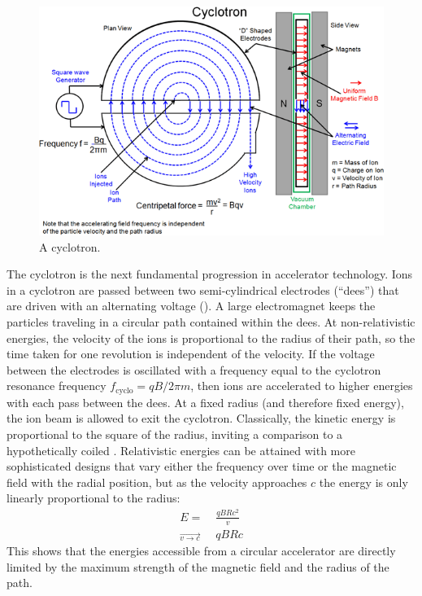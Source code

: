 \begin{figure}[t]
  \includegraphics{cyclotron.png}
  \caption{A cyclotron.}
  \label{fig:cyclotron}
\end{figure}
The cyclotron is the next fundamental progression in accelerator technology.
Ions in a cyclotron are passed between two semi-cylindrical electrodes (``dees'') that are driven with an alternating voltage ().
A large electromagnet keeps the particles traveling in a circular path contained within the dees.
At non-relativistic energies, the velocity of the ions is proportional to the radius of their path, so the time taken for one revolution is independent of the velocity.
If the voltage between the electrodes is oscillated with a frequency equal to the cyclotron resonance frequency $f_\textrm{cyclo} = q B / 2\pi m$, then ions are accelerated to higher energies with each pass between the dees.
At a fixed radius (and therefore fixed energy), the ion beam is allowed to exit the cyclotron.
Classically, the kinetic energy is proportional to the square of the radius, inviting a comparison to a hypothetically coiled \linac.
Relativistic energies can be attained with more sophisticated designs that vary either the frequency over time or the magnetic field with the radial position, but as the velocity approaches $c$ the energy is only linearly proportional to the radius:
\begin{align}
\label{eq:gyroradius}
E =& \; \frac{q B R c^2}{v}\\
\overrightarrow{{}_{v \rightarrow c}}& \; q B R c
\end{align}
This shows that the energies accessible from a circular accelerator are directly limited by the maximum strength of the magnetic field and the radius of the path.

